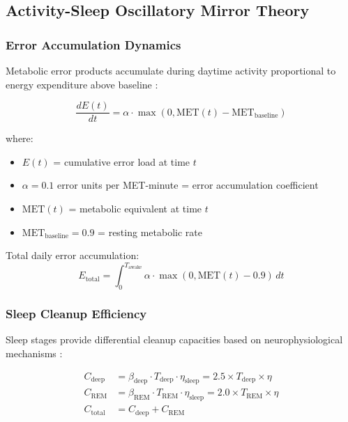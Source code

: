 \documentclass[12pt,twocolumn]{article}
\theoremstyle{remark}
\begin{document}
\subsection{Activity-Sleep Oscillatory Mirror Theory}

\subsubsection{Error Accumulation Dynamics}

Metabolic error products accumulate during daytime activity proportional to energy expenditure above baseline \citep{bellesi2015effects,tononi2014sleep}:

\begin{equation}
\frac{dE(t)}{dt} = \alpha \cdot \max(0, \text{MET}(t) - \text{MET}_{\text{baseline}})
\end{equation}

where:
\begin{itemize}
\item $E(t)$ = cumulative error load at time $t$
\item $\alpha = 0.1$ error units per MET-minute = error accumulation coefficient
\item $\text{MET}(t)$ = metabolic equivalent at time $t$
\item $\text{MET}_{\text{baseline}} = 0.9$ = resting metabolic rate
\end{itemize}

Total daily error accumulation:
\begin{equation}
E_{\text{total}} = \int_0^{T_{\text{awake}}} \alpha \cdot \max(0, \text{MET}(t) - 0.9) \, dt
\end{equation}

\subsubsection{Sleep Cleanup Efficiency}

Sleep stages provide differential cleanup capacities based on neurophysiological mechanisms \citep{kang2013amyloid,fultz2019coupled}:

\begin{align}
C_{\text{deep}} &= \beta_{\text{deep}} \cdot T_{\text{deep}} \cdot \eta_{\text{sleep}} = 2.5 \times T_{\text{deep}} \times \eta \\
C_{\text{REM}} &= \beta_{\text{REM}} \cdot T_{\text{REM}} \cdot \eta_{\text{sleep}} = 2.0 \times T_{\text{REM}} \times \eta \\
C_{\text{total}} &= C_{\text{deep}} + C_{\text{REM}}
\end{align}
\end{document}
